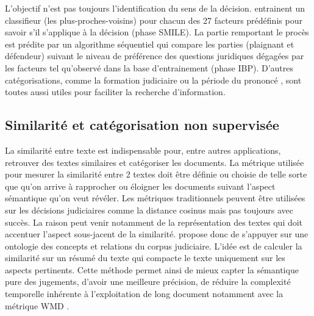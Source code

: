 L'objectif n'est pas toujours l'identification du sens de la décision. \cite{Ashley2009classifCases} entrainent un classifieur (les plus-proches-voisins) pour chacun des 27 facteurs prédéfinis pour savoir s'il s'applique à la décision (phase SMILE). La partie remportant le procès est prédite par un algorithme séquentiel qui compare les parties (plaignant et défendeur) suivant le niveau de préférence des questions juridiques dégagées par les facteurs tel qu'observé dans la base d'entrainement (phase IBP).  D'autres catégorisations, comme la formation judiciaire ou la période du prononcé \citep{Sulea2017predictareadecision,sulea2017legalEnsSVM}, sont toutes aussi utiles pour faciliter la recherche d'information.

\subsection{Similarité et catégorisation non supervisée}

La similarité entre texte est indispensable pour, entre autres applications, retrouver des textes similaires et catégoriser les documents. La métrique utilisée pour mesurer la similarité entre 2 textes doit être définie ou choisie de telle sorte que qu'on arrive à rapprocher ou éloigner les documents suivant l'aspect sémantique qu'on veut révéler. Les métriques traditionnels peuvent être utilisées sur les décisions judiciaires comme la distance cosinus \citep{thenmozhi2017legalprecedretriev} mais pas toujours avec succès. La raison peut venir notamment de la représentation des textes qui doit accentuer l'aspect sous-jacent de la similarité. \citet{ma2018wmdchinesecase} propose donc de s'appuyer sur une ontologie des concepts et relations du corpus judiciaire. L'idée est de calculer la similarité sur un résumé du texte qui compacte le texte uniquement sur les aspects pertinents. Cette méthode permet ainsi de mieux capter la sémantique pure des jugements, d'avoir une meilleure précision, de réduire la complexité temporelle inhérente à l'exploitation de long document notamment avec la métrique WMD \citep{kusner2015wordmoverdist}.

